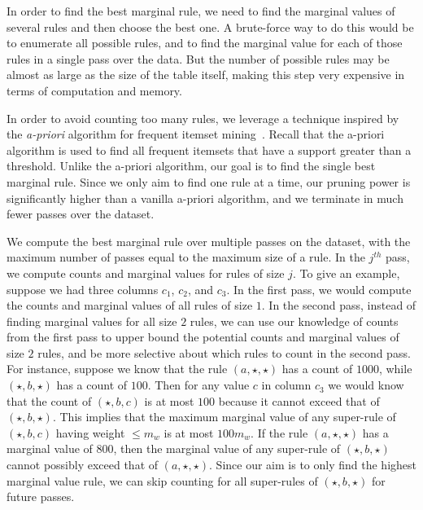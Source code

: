  In order to find the best marginal rule, we need to find the marginal values of several rules and then choose the best one. A brute-force way to do this would be to enumerate all possible rules, and to find the marginal value for each of those rules in a single pass over the data. But the number of possible rules may be almost as large as the size of the table itself, making this step very expensive in terms of computation and memory. 

In order to avoid counting too many rules, we leverage a technique inspired by the {\em a-priori} algorithm for frequent itemset mining~\cite{apriori}. Recall that the a-priori algorithm is used to find all frequent itemsets that have a support greater than a threshold. Unlike the a-priori algorithm, our goal is to find the single best marginal rule. Since we only aim to find one rule at a time, our pruning power is significantly higher than a vanilla a-priori algorithm, and we terminate in much fewer passes over the dataset. 

We compute the best marginal rule over multiple passes on the dataset, with the maximum number of passes equal to the maximum size of a rule. In the $j^{th}$ pass, we compute counts and marginal values for rules of size $j$. To give an example, suppose we had three columns $c_1$, $c_2$, and $c_3$. In the first pass, we would compute the counts and marginal values of all rules of size $1$. In the second pass, instead of finding marginal values for all size $2$ rules, we can use our knowledge of counts from the first pass to upper bound the potential counts and marginal values of size $2$ rules, and be more selective about which rules to count in the second pass. For instance, suppose we know that the rule $(a, \star, \star)$ has a count of $1000$, while $(\star, b, \star)$ has a count of $100$. Then for any value $c$ in column $c_3$ we would know that the count of $(\star, b, c)$ is at most $100$ because it cannot exceed that of $(\star, b, \star)$. This implies that the maximum marginal value of any super-rule of $(\star, b, c)$ having weight $\leq m_w$ is at most $100m_w$. If the rule $(a, \star, \star)$ has a marginal value of $800$, then the marginal value of any super-rule of $(\star, b, \star)$ cannot possibly exceed that of $(a, \star, \star)$. Since our aim is to only find the highest marginal value rule, we can skip counting for all super-rules of $(\star, b, \star)$ for future passes.

